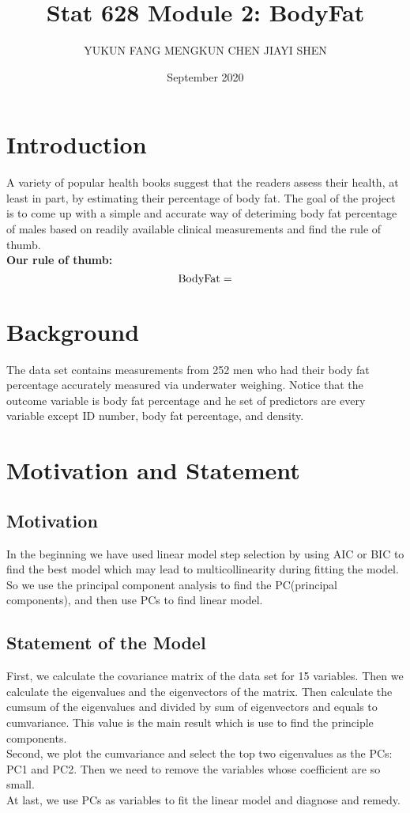 \documentclass[12pt]{article}
\title{\vspace{-3em}Stat 628 Module 2: BodyFat}
\author{YUKUN FANG \quad MENGKUN CHEN \quad JIAYI SHEN}
\date{September 2020}
\begin{document}
\sffamily
\maketitle
\section{\sffamily Introduction}
A variety of popular health books suggest that the readers assess their 
health, at least in part, by estimating their percentage of body fat.
The goal of the project is to come up with 
a simple and accurate way of deteriming body fat percentage of males
based on readily available clinical measurements and find the rule of thumb.\\
\textbf{Our rule of thumb:} $$ {\rm BodyFat} = $$
\section{\sffamily Background}
The data set contains measurements from 252 men who had their body fat 
percentage accurately measured via underwater weighing. Notice that the 
outcome variable is body fat percentage and he set of predictors are 
every variable except ID number, body fat percentage, and density.
\section{\sffamily Motivation and Statement}
\subsection{\sffamily Motivation}
In the beginning we have used linear model step selection by using 
AIC or BIC to find the best model which may lead to multicollinearity during fitting the model.
So we use the principal component analysis to find the PC(principal components), and
then use PCs to find linear model.

\subsection{\sffamily Statement of the Model}
First, we calculate the covariance matrix of the data set for 15 variables.
Then we calculate the eigenvalues and the eigenvectors of the matrix.
Then calculate the cumsum of the eigenvalues and divided by sum of eigenvectors and equals to cumvariance. 
This value is the main result which is use to find the principle components.\\
\newline
Second, we plot the cumvariance and select the top two eigenvalues as the PCs: PC1 and PC2.
Then we need to remove the variables whose coefficient are so small.\\
\newline 
At last, we use PCs as variables to fit the linear model and diagnose and remedy.
\end{document}
